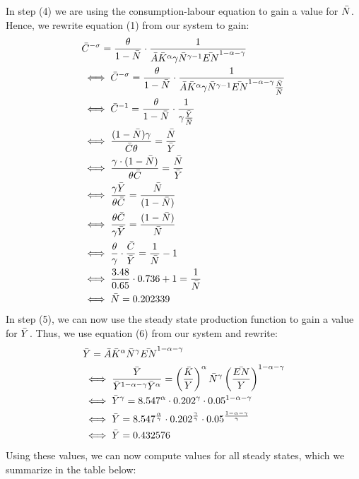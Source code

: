 \documentclass[a4paper,11pt]{article}
\begin{document}
In step (4) we are using the consumption-labour equation to gain a value for $\Bar{N}$. Hence, we rewrite equation (1) from our system to gain:
\begin{align*}
    &\Bar{C}^{-\sigma}=\frac{\theta}{1-\Bar{N}}\cdot \frac{1}{\Bar{A}\Bar{K}^\alpha \gamma \Bar{N}^{\gamma-1} \Bar{EN}^{1-\alpha-\gamma}}\\
    &\iff \Bar{C}^{-\sigma}=\frac{\theta}{1-\Bar{N}}\cdot \frac{1}{\Bar{A}\Bar{K}^\alpha \gamma \Bar{N}^{\gamma-1} \Bar{EN}^{1-\alpha-\gamma}\frac{\Bar{N}}{\Bar{N}}}\\
    &\iff \Bar{C}^{-1}=\frac{\theta}{1-\Bar{N}}\cdot \frac{1}{\gamma \frac{\Bar{Y}}{\Bar{N}}}\\
    &\iff \frac{(1-\Bar{N})\gamma}{\Bar{C}\theta}=\frac{\Bar{N}}{\Bar{Y}}\\
    &\iff \frac{\gamma\cdot(1-\Bar{N})}{\theta\Bar{C}}=\frac{\Bar{N}}{\Bar{Y}}\\
    &\iff \frac{\gamma\Bar{Y}}{\theta\Bar{C}}=\frac{\Bar{N}}{(1-\Bar{N})}\\
    &\iff \frac{\theta\Bar{C}}{\gamma\Bar{Y}}=\frac{(1-\Bar{N})}{\Bar{N}}\\
    &\iff \frac{\theta}{\gamma}\cdot\frac{\Bar{C}}{\Bar{Y}}=\frac{1}{\Bar{N}} - 1\\
    &\iff \frac{3.48}{0.65}\cdot0.736 + 1=\frac{1}{\Bar{N}} \\
    &\iff \Bar{N} = 0.202339
\end{align*}
In step (5), we can now use the steady state production function to gain a value for $\Bar{Y}$. Thus, we use equation (6) from our system and rewrite:
\begin{align*}
        &\Bar{Y} = \Bar{A}\Bar{K}^\alpha \Bar{N}^\gamma \Bar{EN}^{1-\alpha-\gamma}\\
        &\iff \frac{\Bar{Y}}{\Bar{Y}^{1-\alpha-\gamma}\Bar{Y}^\alpha} =\left(\frac{\Bar{K}}{Y}\right)^\alpha \Bar{N}^\gamma \left(\frac{\Bar{EN}}{Y}\right)^{1-\alpha-\gamma}\\
        &\iff \Bar{Y}^\gamma =8.547^\alpha \cdot 0.202^{\gamma} \cdot 0.05^{1-\alpha-\gamma}\\
        &\iff \Bar{Y} =8.547^\frac{\alpha}{\gamma} \cdot 0.202^{\frac{\gamma}{\gamma}} \cdot 0.05^{\frac{1-\alpha-\gamma}{\gamma}}\\
        &\iff \Bar{Y} = 0.432576
\end{align*}
Using these values, we can now compute values for all steady states, which we summarize in the table below:
\end{document}
